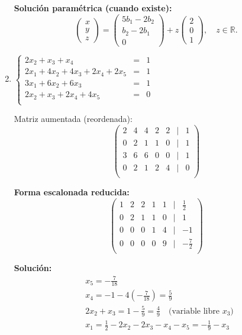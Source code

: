 \begin{prob}
\begin{enumerate}[$a)$]
\begin{myproof}
    \textbf{Solución paramétrica (cuando existe):}
    \[
    \begin{pmatrix} x \\ y \\ z \end{pmatrix} = 
    \begin{pmatrix} 5b_1 - 2b_2 \\ b_2 - 2b_1 \\ 0 \end{pmatrix} + 
    z \begin{pmatrix} 2 \\ 0 \\ 1 \end{pmatrix}, \quad z \in \mathbb{R}.
    \]
    \end{myproof}
	
	\item $\left\lbrace \begin{array}{ccc}
	2x_2+x_3+x_4&=&1\\
	2x_1+4x_2+4x_3+2x_4+2x_5&=&1\\
	3x_1+6x_2+6x_3&=&1\\
	2x_2+x_3+2x_4+4x_5&=&0\\
	\end{array} \right. $ 
	
	\begin{myproof}
    Matriz aumentada (reordenada):
    \[
    \begin{pmatrix}
    2 & 4 & 4 & 2 & 2 & | & 1 \\
    0 & 2 & 1 & 1 & 0 & | & 1 \\
    3 & 6 & 6 & 0 & 0 & | & 1 \\
    0 & 2 & 1 & 2 & 4 & | & 0 \\
    \end{pmatrix}
    \]
    
    \textbf{Forma escalonada reducida:}
    \[
    \begin{pmatrix}
    1 & 2 & 2 & 1 & 1 & | & \frac{1}{2} \\
    0 & 2 & 1 & 1 & 0 & | & 1 \\
    0 & 0 & 0 & 1 & 4 & | & -1 \\
    0 & 0 & 0 & 0 & 9 & | & -\frac{7}{2} \\
    \end{pmatrix}
    \]
    
    \textbf{Solución:}
    \begin{align*}
    &x_5 = -\frac{7}{18} \\
    &x_4 = -1 - 4\left(-\frac{7}{18}\right) = \frac{5}{9} \\
    &2x_2 + x_3 = 1 - \frac{5}{9} = \frac{4}{9} \quad \text{(variable libre } x_3\text{)} \\
    &x_1 = \frac{1}{2} - 2x_2 - 2x_3 - x_4 - x_5 = -\frac{1}{9} - x_3
    \end{align*}
    

\end{myproof}
\end{enumerate}
\end{prob}
